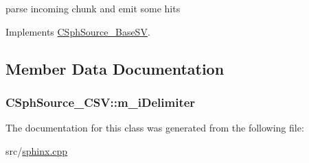 parse incoming chunk and emit some hits 



Implements \hyperlink{classCSphSource__BaseSV_a2a84bb3d23903c8f483c0c02c6d321f4}{C\-Sph\-Source\-\_\-\-Base\-S\-V}.



\subsection{Member Data Documentation}
\hypertarget{classCSphSource__CSV_a6732226dd7e9b3532683d10709088ac9}{
\subsubsection[{m\-\_\-i\-Delimiter}]{ C\-Sph\-Source\-\_\-\-C\-S\-V\-::m\-\_\-i\-Delimiter\hspace{0.3cm}{\ttfamily [private]}}}\label{classCSphSource__CSV_a6732226dd7e9b3532683d10709088ac9}


The documentation for this class was generated from the following file\-:\begin{DoxyCompactItemize}
\item 
src/\hyperlink{sphinx_8cpp}{sphinx.\-cpp}\end{DoxyCompactItemize}
